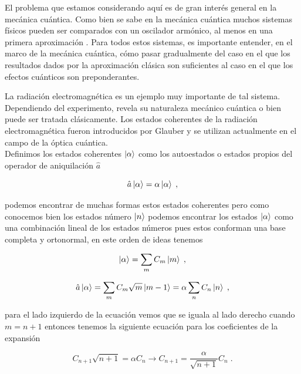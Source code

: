     El problema que estamos considerando aquí es de gran interés general en la mecánica cuántica. Como bien se sabe en la mecánica cuántica muchos sistemas físicos pueden ser comparados con un oscilador armónico, al menos en una primera aproximación \cite{cohen1986quantum}. Para todos estos sistemas, es importante entender, en el marco de la mecánica cuántica, cómo pasar gradualmente del caso en el que los resultados dados por la aproximación clásica son suficientes al caso en el que los efectos cuánticos son preponderantes.

    La radiación electromagnética es un ejemplo muy importante de tal sistema. Dependiendo del experimento, revela su naturaleza mecánico cuántica o bien puede ser tratada clásicamente. Los estados coherentes de la radiación electromagnética fueron introducidos por Glauber y se utilizan actualmente en el campo de la óptica cuántica.\\

    Definimos los estados coherentes $\ket{\alpha}$ como los autoestados o estados propios del operador de aniquilación $\hat{a}$

    \begin{equation}
        \hat{a}\ket{\alpha} = \alpha\ket{\alpha}\;,
    \end{equation}

    podemos encontrar de muchas formas estos estados coherentes pero como conocemos bien los estados número $\ket{n}$ podemos encontrar los estados $\ket{\alpha}$ como una combinación lineal de los estados números pues estos conforman una base completa y ortonormal, en este orden de ideas tenemos

    \begin{equation}
        \ket{\alpha} = \sum_m C_m \ket{m}\;,
    \end{equation}

    \begin{equation}
        \hat{a}\ket{\alpha} = \sum_m C_m \sqrt{m}\ket{m-1} = \alpha \sum_n C_n \ket{n}\;,
    \end{equation}

    para el lado izquierdo de la ecuación vemos que se iguala al lado derecho cuando $m = n +1$ entonces tenemos la siguiente ecuación para los coeficientes de la expansión 
    
    \begin{equation}\label{eq:coefcnmahuno}
        C_{n+1}\sqrt{n + 1} = \alpha C_n \rightarrow C_{n+1} = \frac{\alpha}{\sqrt{n + 1}}C_n \;.
    \end{equation}

